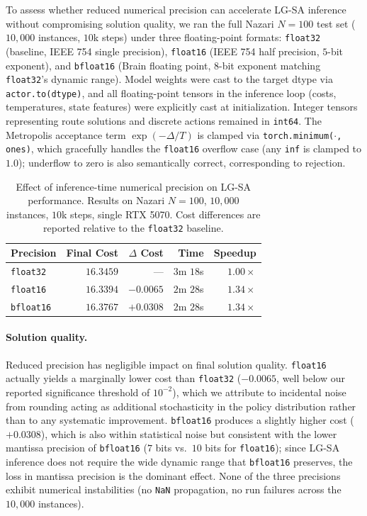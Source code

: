 \documentclass[letterpaper]{article} %
\begin{document}
To assess whether reduced numerical precision can accelerate LG-SA inference without compromising solution quality, we ran the full Nazari $N{=}100$ test set ($10{,}000$ instances, $10$k steps) under three floating-point formats: \texttt{float32} (baseline, IEEE 754 single precision), \texttt{float16} (IEEE 754 half precision, $5$-bit exponent), and \texttt{bfloat16} (Brain floating point, $8$-bit exponent matching \texttt{float32}'s dynamic range). Model weights were cast to the target dtype via \texttt{actor.to(dtype)}, and all floating-point tensors in the inference loop (costs, temperatures, state features) were explicitly cast at initialization. Integer tensors representing route solutions and discrete actions remained in \texttt{int64}. The Metropolis acceptance term $\exp(-\Delta / T)$ is clamped via \texttt{torch.minimum($\cdot$, ones)}, which gracefully handles the \texttt{float16} overflow case (any \texttt{inf} is clamped to $1.0$); underflow to zero is also semantically correct, corresponding to rejection.

\begin{table}[h]
\centering
\small
\setlength{\tabcolsep}{8pt}
\caption{Effect of inference-time numerical precision on LG-SA performance. Results on Nazari $N{=}100$, $10{,}000$ instances, $10$k steps, single RTX 5070. Cost differences are reported relative to the \texttt{float32} baseline.}
\label{tab:precision_study}
\begin{tabular}{@{}l r r r r@{}}
\toprule
Precision & Final Cost & $\Delta$ Cost & Time & Speedup \\
\midrule
\texttt{float32} & $16.3459$ & --- & $3$m $18$s & $1.00\times$ \\
\texttt{float16} & $16.3394$ & $-0.0065$ & $2$m $28$s & $1.34\times$ \\
\texttt{bfloat16} & $16.3767$ & $+0.0308$ & $2$m $28$s & $1.34\times$ \\
\bottomrule
\end{tabular}
\end{table}

\paragraph{Solution quality.}
Reduced precision has negligible impact on final solution quality. \texttt{float16} actually yields a marginally lower cost than \texttt{float32} ($-0.0065$, well below our reported significance threshold of $10^{-2}$), which we attribute to incidental noise from rounding acting as additional stochasticity in the policy distribution rather than to any systematic improvement. \texttt{bfloat16} produces a slightly higher cost ($+0.0308$), which is also within statistical noise but consistent with the lower mantissa precision of \texttt{bfloat16} ($7$ bits vs.\ $10$ bits for \texttt{float16}); since LG-SA inference does not require the wide dynamic range that \texttt{bfloat16} preserves, the loss in mantissa precision is the dominant effect. None of the three precisions exhibit numerical instabilities (no \texttt{NaN} propagation, no run failures across the $10{,}000$ instances).
\end{document}

